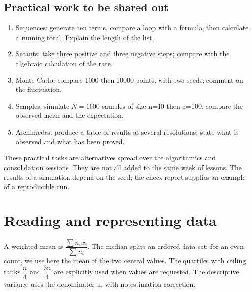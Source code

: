 \subsection*{Practical work to be shared out}\label{TP}
\begin{enumerate}
\item Sequences: generate ten terms, compare a loop with a formula, then calculate a running total. Explain the length of the list.
\item Secants: take three positive and three negative steps; compare with the algebraic calculation of the rate.
\item Monte Carlo: compare \num{1000} then \num{10000} points, with two seeds; comment on the fluctuation.
\item Samples: simulate $N=\num{1000}$ samples of size n=10 then n=100; compare the observed mean and the expectation.
\item Archimedes: produce a table of results at several resolutions; state what is observed and what has been proved.
\end{enumerate}
These practical tasks are alternatives spread over the algorithmics and consolidation sessions. They are not all added to the same week of lessons. The results of a simulation depend on the seed; the check report supplies an example of a reproducible run.

\section{Reading and representing data}\label{STATS}
A weighted mean is $\dfrac{\sum n_ix_i}{\sum n_i}$. The median splits an ordered data set; for an even count, we use here the mean of the two central values. The quartiles with ceiling ranks $\dfrac{n}{4}$ and $\dfrac{3n}{4}$ are explicitly used when values are requested. The descriptive variance uses the denominator n, with no estimation correction.


